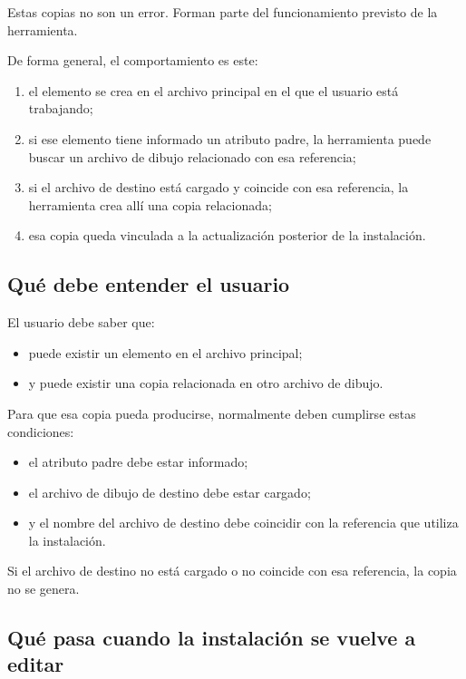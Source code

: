 \documentclass[12pt,a4paper]{article}
\begin{document}
Estas copias no son un error. Forman parte del funcionamiento previsto de la herramienta.

De forma general, el comportamiento es este:

\begin{enumerate}
\item el elemento se crea en el archivo principal en el que el usuario está trabajando;
\item si ese elemento tiene informado un atributo padre, la herramienta puede buscar un archivo de dibujo relacionado con esa referencia;
\item si el archivo de destino está cargado y coincide con esa referencia, la herramienta crea allí una copia relacionada;
\item esa copia queda vinculada a la actualización posterior de la instalación.
\end{enumerate}

\subsection{Qué debe entender el usuario}

El usuario debe saber que:

\begin{itemize}
\item puede existir un elemento en el archivo principal;
\item y puede existir una copia relacionada en otro archivo de dibujo.
\end{itemize}

Para que esa copia pueda producirse, normalmente deben cumplirse estas condiciones:

\begin{itemize}
\item el atributo padre debe estar informado;
\item el archivo de dibujo de destino debe estar cargado;
\item y el nombre del archivo de destino debe coincidir con la referencia que utiliza la instalación.
\end{itemize}

Si el archivo de destino no está cargado o no coincide con esa referencia, la copia no se genera.

\subsection{Qué pasa cuando la instalación se vuelve a editar}
\end{document}
